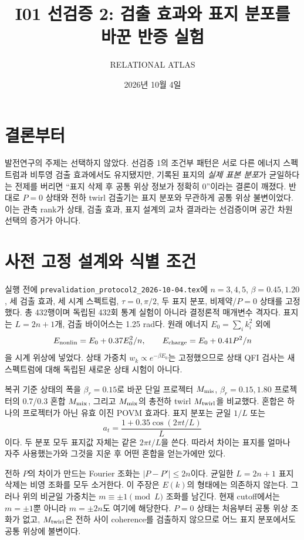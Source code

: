\documentclass[11pt,a4paper]{article}
\title{I01 선검증 2: 검출 효과와 표지 분포를 바꾼 반증 실험}
\author{RELATIONAL ATLAS}
\date{2026년 10월 4일}
\begin{document}
\maketitle

\section{결론부터}
발전연구의 주제는 선택하지 않았다. 선검증 1의 조건부 패턴은
서로 다른 에너지 스펙트럼과 비투영 검출 효과에서도 유지됐지만,
기록된 표지의 \emph{실제 표본 분포}가 균일하다는 전제를 버리면
``표지 삭제 후 공통 위상 정보가 정확히 0''이라는 결론이 깨졌다.
반대로 $P=0$ 상태와 전하 twirl 검출기는 표지 분포와 무관하게
공통 위상 불변이었다. 이는 관측 rank가 상태, 검출 효과, 표지 설계의
교차 결과라는 선검증이며 공간 차원 선택의 증거가 아니다.

\section{사전 고정 설계와 식별 조건}
실행 전에 \texttt{prevalidation\_protocol2\_2026-10-04.tex}에
$n=3,4,5$, $\beta=0.45,1.20$, 세 검출 효과, 세 시계 스펙트럼,
$\tau=0,\pi/2$, 두 표지 분포, 비제약/$P=0$ 상태를 고정했다.
총 432행이며 독립된 432회 통계 실험이 아니라 결정론적 매개변수 격자다.
표지는 $L=2n+1$개, 검출 바이어스는 1.25 rad다.
원래 에너지 $E_0=\sum_i k_i^2$ 외에
\begin{equation}
E_{\rm nonlin}=E_0+0.37E_0^2/n,\qquad
E_{\rm charge}=E_0+0.41P^2/n
\end{equation}
을 시계 위상에 넣었다. 상태 가중치 $w_k\propto e^{-\beta E_0}$는
고정했으므로 상태 QFI 검사는 새 스펙트럼에 대해 독립된 새로운 상태
시험이 아니다.

복귀 기준 상태의 폭을 $\beta_r=0.15$로 바꾼 단일 프로젝터
$M_{\rm mis}$, $\beta_r=0.15,1.80$ 프로젝터의 0.7/0.3 혼합
$M_{\rm mix}$, 그리고 $M_{\rm mix}$의 총전하 twirl
$M_{\rm twirl}$을 비교했다. 혼합은 하나의 프로젝터가 아닌 유효
이진 POVM 효과다. 표지 분포는 균일 $1/L$ 또는
\begin{equation}
a_t=\frac{1+0.35\cos(2\pi t/L)}{L}
\end{equation}
이다. 두 분포 모두 표지값 자체는 같은 $2\pi t/L$을 쓴다.
따라서 차이는 표지를 얼마나 자주 사용했는가와 그것을 지운 후
어떤 혼합을 얻는가에만 있다.

전하 $P$의 차이가 만드는 Fourier 조화는
$|P-P'|\le2n$이다. 균일한 $L=2n+1$ 표지 삭제는 비영 조화를
모두 소거한다. 이 주장은 $E(k)$의 형태에는 의존하지 않는다.
그러나 위의 비균일 가중치는 $m\equiv\pm1\pmod L$ 조화를 남긴다.
현재 cutoff에서는 $m=\pm1$뿐 아니라 $m=\pm2n$도 여기에 해당한다.
$P=0$ 상태는 처음부터 공통 위상 조화가 없고,
$M_{\rm twirl}$은 전하 사이 coherence를 검출하지 않으므로
어느 표지 분포에서도 공통 위상에 불변이다.
\end{document}
